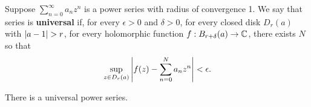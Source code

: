 \documentclass{homework}
\begin{document}
                                                                                        \begin{problem}\label{universal-taylor-series}Suppose
                                                                                          $\displaystyle\sum_{n=0}^\infty a_n z^n$ is a power series with
                                                                                            radius of convergence 1.  We say that series is \textbf{universal}
                                                                                              if, for every $\epsilon > 0$ and $\delta > 0$, for every closed disk
                                                                                                $D_r(a)$ with $\left|a-1\right| > r$, for every holomorphic function
                                                                                                  $f : B_{r + \delta}(a) \to \mathbb{C}$, there exists $N$ so that
                                                                                                    \[
                                                                                                        \sup_{z \in D_r(a)} \left| f(z) - \sum_{n=0}^N a_n z^n \right| < \epsilon.
                                                                                                          \]

                                                                                                            There is a universal power series.
                                                                                                            \end{problem}
\end{document}
